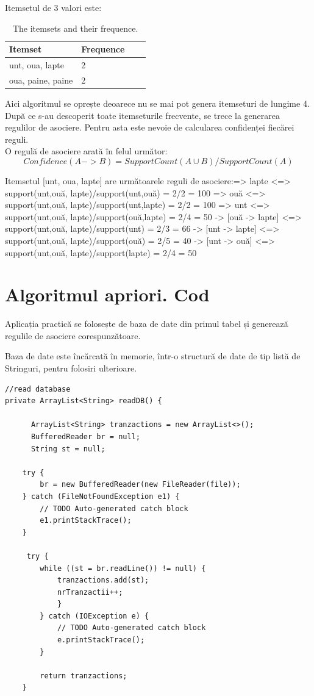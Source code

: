 \documentclass[11pt]{diazessay} %
\begin{document}
Itemsetul de 3 valori este:

\begin{table}[h]
\caption{The itemsets and their frequence.}
\centering
\begin{tabular}{llll}
		\toprule
		\cmidrule(r){1-2}
		Itemset & Frequence \\
		\midrule
		unt, oua, lapte & 2 &  \\
      	oua, paine, paine & 2 &  \\
\end{tabular}
\end{table}

Aici algoritmul se oprește deoarece nu se mai pot genera itemseturi de lungime 4. După ce s-au descoperit toate itemseturile frecvente, se trece la generarea regulilor de asociere. Pentru asta este nevoie de calcularea confidenței fiecărei reguli.\\

O regulă de asociere arată în felul următor: 
\begin{equation}
Confidence(A->B)=SupportCount(A\cup B)/SupportCount(A)
\end{equation}

Itemsetul [unt, oua, lapte] are următoarele reguli de asociere: => lapte <=> support(unt,ouă, lapte)/support(unt,ouă) = 2/2 = 100  => ouă <=> support(unt,ouă, lapte)/support(unt,lapte) = 2/2 = 100  => unt <=> support(unt,ouă, lapte)/support(ouă,lapte) = 2/4 = 50 \break
[unt] -> [ouă -> lapte] <=> support(unt,ouă, lapte)/support(unt) = 2/3 = 66 \break
[ouă] -> [unt -> lapte] <=> support(unt,ouă, lapte)/support(ouă) = 2/5 = 40 \break
[lapte] -> [unt -> ouă] <=>  support(unt,ouă, lapte)/support(lapte) = 2/4 = 50 \break


\section*{Algoritmul apriori. Cod}

Aplicația practică se folosește de baza de date din primul tabel și generează regulile de asociere corespunzătoare.

Baza de date este încărcată în memorie, într-o structură de date de tip listă de Stringuri, pentru folosiri ulterioare.

\begin{lstlisting}
//read database
private ArrayList<String> readDB() {
		
	  ArrayList<String> tranzactions = new ArrayList<>();
	  BufferedReader br = null;
	  String st = null; 
	  
	try {
		br = new BufferedReader(new FileReader(file));
	} catch (FileNotFoundException e1) {
		// TODO Auto-generated catch block
		e1.printStackTrace();
	} 
	  
	 try {
		while ((st = br.readLine()) != null) {
			tranzactions.add(st);
			nrTranzactii++;
			}
		} catch (IOException e) {
			// TODO Auto-generated catch block
			e.printStackTrace();
		} 

		return tranzactions;
	}
\end{lstlisting}
\end{document}

